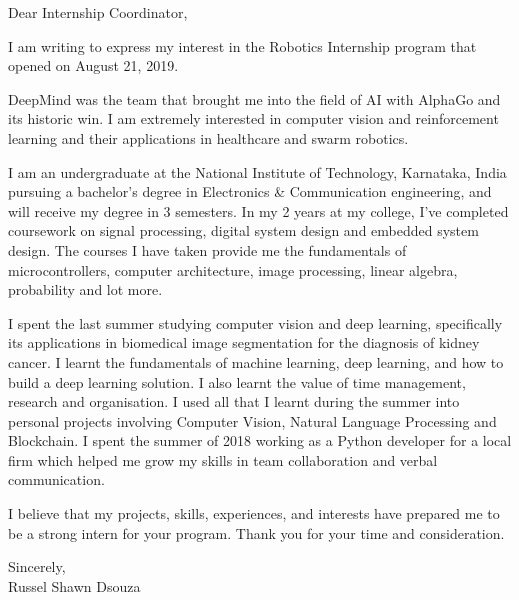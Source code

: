 \documentclass[11pt,a4paper,sans]{moderncv}
\begin{document}
  \date{August 23, 2019}
  \opening{Dear Internship Coordinator,}
  \makelettertitle

  I am writing to express my interest in the Robotics Internship program that opened on August 21, 2019. 
  
  DeepMind was the team that brought me into the field of AI with AlphaGo and its historic win. I am extremely interested in computer vision and reinforcement learning and their applications in healthcare and swarm robotics.

  I am an undergraduate at the National Institute of Technology, Karnataka, India pursuing a bachelor's degree in Electronics \& Communication
  engineering, and will receive my degree in 3 semesters. In my 2 years at my college, I've completed coursework on signal processing, digital system design and embedded system design. The courses I have taken provide me the fundamentals of microcontrollers, computer architecture, image processing, linear algebra, probability and lot more.

  I spent the last summer studying computer vision and deep learning, specifically its applications in biomedical image segmentation for the diagnosis of kidney cancer. I learnt the fundamentals of machine learning, deep learning, and how to build a deep learning solution. I also learnt the value of time management, research and organisation. I used all that I learnt during the summer into personal projects involving Computer Vision, Natural Language Processing and Blockchain. I spent the summer of 2018 working as a Python developer for a local firm which helped me grow my skills in team collaboration and verbal communication.

  I believe that my projects, skills, experiences, and interests have prepared me to be a strong intern for your program.
  Thank you for your time and consideration.

  Sincerely,\\
  Russel Shawn Dsouza
\end{document}
